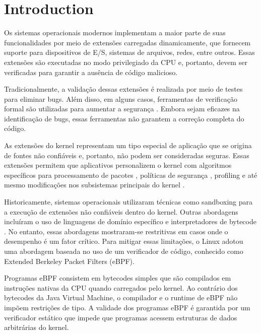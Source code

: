 \documentclass[sigconf]{acmart}
\begin{document}
\maketitle

\section{Introduction}

Os sistemas operacionais modernos implementam a maior parte de suas funcionalidades por meio de extensões carregadas dinamicamente, que fornecem suporte para dispositivos de E/S, sistemas de arquivos, redes, entre outros. Essas extensões são executadas no modo privilegiado da CPU e, portanto, devem ser verificadas para garantir a ausência de código malicioso.

Tradicionalmente, a validação dessas extensões é realizada por meio de testes para eliminar bugs. Além disso, em alguns casos, ferramentas de verificação formal são utilizadas para aumentar a segurança \cite{ball2006thorough} \cite{lal2014powering}. Embora sejam eficazes na identificação de bugs, essas ferramentas não garantem a correção completa do código.

As extensões do kernel representam um tipo especial de aplicação que se origina de fontes não confiáveis e, portanto, não podem ser consideradas seguras. Essas extensões permitem que aplicativos personalizem o kernel com algoritmos específicos para processamento de pacotes \cite{Express}, políticas de segurança \cite{Seccomp}, profiling \cite{Visor} e até mesmo modificações nos subsistemas principais do kernel \cite{amit2017hypercallbacks}.

Historicamente, sistemas operacionais utilizaram técnicas como sandboxing para a execução de extensões não confiáveis dentro do kernel. Outras abordagens incluíram o uso de linguagens de domínio específico \cite{bershad1995extensibility} \cite{fahndrich2006language} e interpretadores de bytecode \cite{mccanne1993bsd}. No entanto, essas abordagens mostraram-se restritivas em casos onde o desempenho é um fator crítico. Para mitigar essas limitações, o Linux adotou uma abordagem baseada no uso de um verificador de código, conhecido como Extended Berkeley Packet Filters (eBPF).

Programas eBPF consistem em bytecodes simples que são compilados em instruções nativas da CPU quando carregados pelo kernel. Ao contrário dos bytecodes da Java Virtual Machine, o compilador e o runtime de eBPF não impõem restrições de tipo. A validade dos programas eBPF é garantida por um verificador estático que impede que programas acessem estruturas de dados arbitrárias do kernel.
\end{document}
